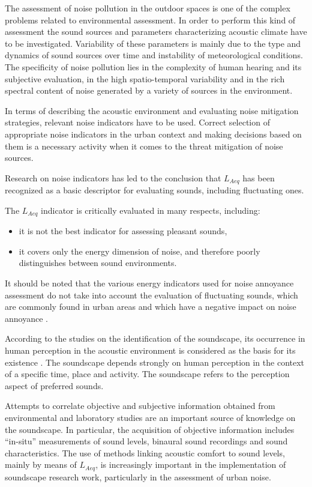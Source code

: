 \documentclass[a4paper,10pt]{article}
\begin{document}
\begin{multicols}{2}

The assessment of noise pollution in the outdoor spaces is one of the complex
problems related to environmental assessment. In order to perform this kind of
assessment the sound sources and parameters characterizing acoustic climate have
to be investigated. Variability of these parameters is mainly due to the type
and dynamics of sound sources over time and instability of meteorological
conditions.  The specificity of noise pollution lies in the complexity of human
hearing and its subjective evaluation, in the high spatio-temporal variability
and in the rich spectral content of noise generated by a variety of sources in
the environment.

In terms of describing the acoustic environment and evaluating noise mitigation
strategies, relevant noise indicators have to be used. Correct selection of
appropriate noise indicators in the urban context and making decisions based on
them is a necessary activity when it comes to the threat mitigation of noise
sources.

Research on noise indicators has led to the conclusion that $L_{Aeq}$ has been
recognized as a basic descriptor for evaluating sounds, including fluctuating
ones.

The $L_{Aeq}$ indicator is critically evaluated in many respects, including:
\begin{itemize}
    \item it is not the best indicator for assessing pleasant sounds,
    \item it covers only the energy dimension of noise, and therefore poorly
    distinguishes between sound environments.
\end{itemize}

It should be noted that the various energy indicators used for noise annoyance
assessment do not take into account the evaluation of fluctuating sounds, which
are commonly found in urban areas and which have a negative impact on noise
  annoyance \cite{Schomer:2005}.

According to the studies on the identification of the soundscape, its occurrence
in human perception in the acoustic environment is considered as the basis for
  its existence \cite{Brown:2010}. The soundscape depends strongly on human perception in the
context of a specific time, place and activity. The soundscape refers to the
perception aspect of preferred sounds.

Attempts to correlate objective and subjective information obtained from
environmental and laboratory studies are an important source of knowledge on the
soundscape. In particular, the acquisition of objective information includes
``in-situ'' measurements of sound levels, binaural sound recordings and sound
characteristics. The use of methods linking acoustic comfort to sound levels,
mainly by means of $L_{Aeq}$, is increasingly important in the implementation of
soundscape research work, particularly in the assessment of urban noise.


\end{multicols}
\end{document}
